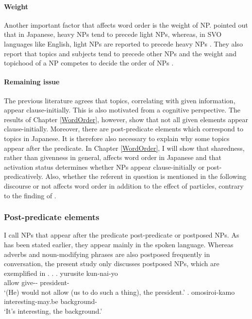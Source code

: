 \paragraph{Weight}

Another important factor that affects word order is the weight of NP.
 pointed out that
in Japanese,
heavy NPs tend to precede light NPs,
whereas, in SVO languages like English,
light NPs are reported to precede heavy NPs \cite[e.g.,][]{arnoldetal00}.
They also report that topics and subjects tend to precede other NPs
and the weight and topichood of a NP competes to decide the order of NPs \cite[see also][]{kondoyamashita07}.


\paragraph{Remaining issue}

The previous literature agrees that topics,
correlating with given information, appear clause-initially.
This is also motivated from a cognitive perspective.
The results of Chapter \ref{WordOrder}, however, show that
not all given elements appear clause-initially.
Moreover, there are post-predicate elements which correspond to topics in Japanese.
It is therefore also necessary to explain why some topics appear after the predicate.
In Chapter \ref{WordOrder},
I will show that sharedness,
rather than givenness in general,
affects word order in Japanese and that
activation status determines whether
NPs appear clause-initially or post-predicatively.
Also, whether the referent in question is mentioned in the following discourse or not affects word order in addition to the effect of particles,
contrary to the finding of .

\subsubsection{Post-predicate elements}\label{Back:CharJ:WO:PostP}

I call NPs that appear after the predicate post-predicate or postposed NPs.
As has been stated earlier,
they appear mainly in the spoken language.
Whereas adverbs and noun-modifying phrases are also postposed frequently in conversation,
the present study only discusses postposed NPs,
which are exemplified in \Next.
%
\ex.
 \ag. yurusite kun-nai-yo  \\
      allow give-- president- \\
      `(He) would not allow (us to do such a thing), the president.'
      \hfill{\cite[431]{onosuzuki92}}
 \bg. omosiroi-kamo  \\
      interesting-may.be background- \\
      `It's interesting, the background.'
      \hfill{\cite[9]{nakagawaetal08_paper}}


